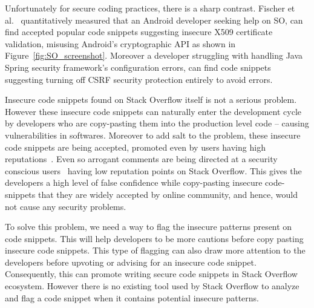    Unfortunately for secure coding practices, there is a sharp contrast. Fischer et al.~\cite{fischer2017stack} quantitatively 
   measured that an Android developer seeking help on SO, can find accepted popular code snippets suggesting insecure 
   X509 certificate validation, misusing Android’s cryptographic API  as shown in Figure~\ref{fig:SO_screenshot}. 
   Moreover a developer struggling with handling Java Spring security framework's configuration errors, 
   can find code snippets suggesting turning off CSRF security protection entirely to avoid errors. 
   
   Insecure code snippets found on Stack Overflow itself is not a serious problem. However 
   these insecure code snippets can  naturally enter the development cycle by developers who are copy-pasting them into 
   the production level code -- causing vulnerabilities in softwares.
   Moreover to add salt to the problem, these insecure code snippets are being accepted, promoted even by users having high reputations~\cite{meng2018secure}.
   Even so arrogant comments are being directed at a security conscious users~\cite{java-so-cyber-bullying} having low reputation points on Stack Overflow. 
   This gives the developers a high level of false confidence while copy-pasting insecure code-snippets that they 
   are widely accepted by online community, and hence, would not cause any security problems. 

   
   
   To solve this problem, we need a way to flag the insecure patterns present on code snippets. 
   This will help developers to be more cautions before copy pasting insecure code snippets. This type of flagging can also 
   draw more attention to the developers before upvoting or advising for an insecure code snippet. 
   Consequently, this can promote writing secure code snippets in Stack Overflow ecosystem.
   However there is no existing tool used by Stack Overflow to analyze and flag a code snippet when it contains potential insecure patterns.
   

